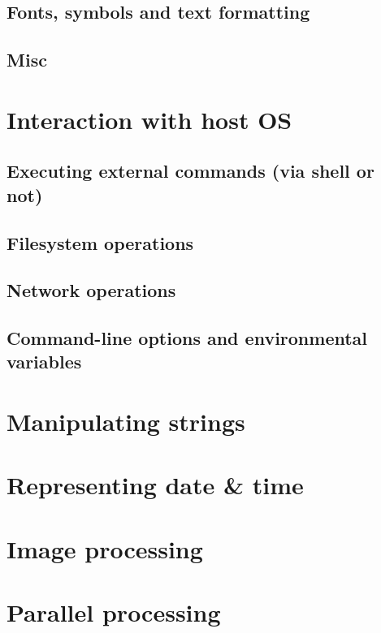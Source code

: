 \documentclass[10pt,titleauthor,openany]{mwbk}
\begin{document}
  \section{Fonts, symbols and text formatting}
  
  \section{Misc}
  

  \chapter{Interaction with host OS}
  
  \section{Executing external commands (via shell or not)}
  
  \section{Filesystem operations}
  
  \section{Network operations}
  
  \section{Command-line options and environmental variables}
  

  \chapter{Manipulating strings}
  

  \chapter{Representing date \& time}
  

  \chapter{Image processing}
  
  
  \chapter{Parallel processing}
\end{document}
